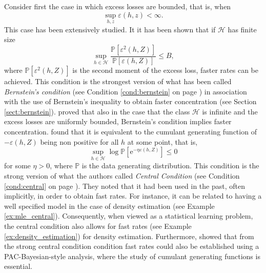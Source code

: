 \documentclass{uvamath}
\newcommand*{\calH}{\mathcal{H}}
\newcommand*{\bbP}{\mathbb{P}}
\newcommand*{\rme}{\mathrm{e}}
\theoremstyle{remark}
\theoremstyle{definition}
\theoremstyle{definition}
\theoremstyle{definition}
\theoremstyle{definition}
\theoremstyle{definition}
\begin{document}
Consider first the case in which excess losses are bounded, that is,
when $$\sup_{h,z}\varepsilon(h, z)<\infty.$$ This case has been
extensively studied. It it has been shown that if $\calH$ has finite
size
\begin{equation*}
  \sup_{h\in\calH}\frac{\bbP[\varepsilon^2(h,Z)]}{\bbP[\varepsilon(h,Z)]}
  \leq B,
\end{equation*}
where $\bbP[\varepsilon^2(h,Z)]$ is the second moment of the excess
loss, faster rates can be achieved. This condition is the strongest
version of what has been called \textit{Bernstein's condition} (see
Condition \ref{cond:bernstein} on page \pageref{cond:bernstein} ) in
association with the use of Bernstein's inequality to obtain faster
concentration (see Section \ref{sect:bernstein}).
\citet{bartlett_empirical_2006} proved that also in the case that the
class $\calH$ is infinite and the excess losses are uniformly bounded,
Bernstein's condition implies faster
concentration. \citet{van_erven_fast_2015} found that it is equivalent
to the cumulant generating function of $-\varepsilon(h,Z)$ being non
positive for all $h$ at some point, that is,
\begin{equation*}
  \sup_{h\in\calH}\log\bbP[\rme^{-\eta\varepsilon(h,Z)}]\leq 0
\end{equation*}
for some $\eta>0$, where $\bbP$ is the data generating
distribution. This condition is the strong version of what the authors
called \textit{Central Condition} (see Condition \ref{cond:central} on
page \pageref{cond:central}). They noted that it had been used in the
past, often implicitly, in order to obtain fast rates. For instance,
it can be related to having a well specified model in the case of
density estimation (see Example \ref{ex:mle_central}). Consequently,
when viewed as a statistical learning problem, the central condition
also allows for fast rates (see Example \ref{ex:density_estimation})
for density estimation. Furthermore, \citet{grunwald_fast_2016} showed
that from the strong central condition condition fast rates could also
be established using a PAC-Bayesian-style analysis, where the study of
cumulant generating functions is essential.
\end{document}
